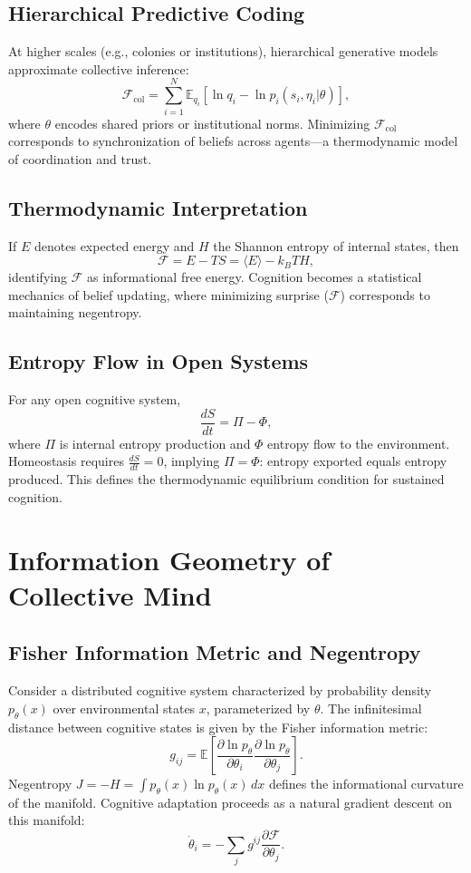 \documentclass[11pt,a4paper]{article}
\begin{document}
\subsection{Hierarchical Predictive Coding}

At higher scales (e.g., colonies or institutions), hierarchical generative models approximate collective inference:
\[
\mathcal{F}_{\text{col}} = \sum_{i=1}^N \mathbb{E}_{q_i}[\ln q_i - \ln p_i(s_i, \eta_i | \theta)],
\]
where $\theta$ encodes shared priors or institutional norms.  
Minimizing $\mathcal{F}_{\text{col}}$ corresponds to synchronization of beliefs across agents—a thermodynamic model of coordination and trust.

\subsection{Thermodynamic Interpretation}

If $E$ denotes expected energy and $H$ the Shannon entropy of internal states, then
\[
\mathcal{F} = E - T S = \langle E \rangle - k_B T H,
\]
identifying $\mathcal{F}$ as informational free energy.  
Cognition becomes a statistical mechanics of belief updating, where minimizing surprise ($\mathcal{F}$) corresponds to maintaining negentropy.

\subsection{Entropy Flow in Open Systems}

For any open cognitive system,
\[
\frac{dS}{dt} = \Pi - \Phi,
\]
where $\Pi$ is internal entropy production and $\Phi$ entropy flow to the environment.  
Homeostasis requires $\frac{dS}{dt} = 0$, implying $\Pi = \Phi$: entropy exported equals entropy produced.  
This defines the thermodynamic equilibrium condition for sustained cognition.

\section{Information Geometry of Collective Mind}
\label{app:info-geometry}

\subsection{Fisher Information Metric and Negentropy}

Consider a distributed cognitive system characterized by probability density $p_\theta(x)$ over environmental states $x$, parameterized by $\theta$.  
The infinitesimal distance between cognitive states is given by the Fisher information metric:
\[
g_{ij} = \mathbb{E} \left[ \frac{\partial \ln p_\theta}{\partial \theta_i} \frac{\partial \ln p_\theta}{\partial \theta_j} \right].
\]
Negentropy $J = -H = \int p_\theta(x) \ln p_\theta(x) \, dx$ defines the informational curvature of the manifold.  
Cognitive adaptation proceeds as a natural gradient descent on this manifold:
\[
\dot{\theta}_i = - \sum_j g^{ij} \frac{\partial \mathcal{F}}{\partial \theta_j}.
\]
\end{document}
